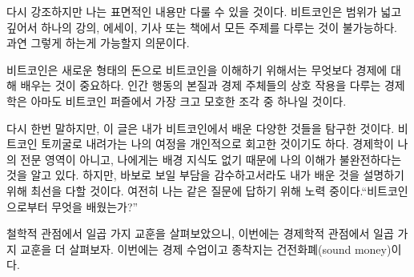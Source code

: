 다시 강조하지만 나는 표면적인 내용만 다룰 수 있을 것이다.  
비트코인은 범위가 넓고 깊어서 하나의 강의, 에세이, 기사 또는 책에서 모든 주제를 다루는 것이 불가능하다.
과연 그렇게 하는게 가능할지 의문이다.  


비트코인은 새로운 형태의 돈으로 비트코인을 이해하기 위해서는 무엇보다 경제에 대해 배우는 것이 중요하다.
인간 행동의 본질과 경제 주체들의 상호 작용을 다루는 경제학은 아마도 비트코인 퍼즐에서 가장 크고 모호한 조각 중 하나일 것이다.

다시 한번 말하지만, 이 글은 내가 비트코인에서 배운 다양한 것들을 탐구한 것이다. 
비트코인 토끼굴로 내려가는 나의 여정을 개인적으로 회고한 것이기도 하다.  
경제학이 나의 전문 영역이 아니고, 나에게는 배경 지식도 없기 때문에 나의 이해가 불완전하다는 것을 알고 있다. 
하지만, 바보로 보일 부담을 감수하고서라도 내가 배운 것을 설명하기 위해 최선을 다할 것이다.
여전히 나는 같은 질문에 답하기 위해 노력 중이다.\enquote{비트코인으로부터 무엇을 배웠는가?}

철학적 관점에서 일곱 가지 교훈을 살펴보았으니, 이번에는 경제학적 관점에서 일곱 가지 교훈을 더 살펴보자.
이번에는 경제 수업이고 종착지는 건전화폐(sound money)이다.

